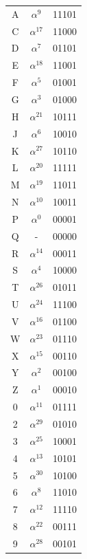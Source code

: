 \documentclass[letterpaper]{article}
\theoremstyle{xxx}
\theoremstyle{evil}
\theoremstyle{yyy}
\theoremstyle{plain}
\theoremstyle{zzz}
\begin{document}
\begin{minipage}[b]{0.3\linewidth}
\begin{center}
\begin{tabular}{|ccc|}
\hline
A & $\alpha^9$ & 11101 \\
C & $\alpha^{17}$ & 11000 \\
D & $\alpha^7$ & 01101 \\
E & $\alpha^{18}$ & 11001 \\
F & $\alpha^5$ & 01001 \\
G & $\alpha^3$ & 01000 \\
H & $\alpha^{21}$ & 10111 \\
J & $\alpha^6$ & 10010 \\
K & $\alpha^{27}$ & 10110 \\
L & $\alpha^{20}$ & 11111 \\
M & $\alpha^{19}$ & 11011 \\
N & $\alpha^{10}$ & 10011 \\
P & $\alpha^0$ & 00001 \\
Q & - & 00000 \\
R & $\alpha^{14}$ & 00011 \\
S & $\alpha^4$ & 10000 \\
T & $\alpha^{26}$ & 01011 \\
U & $\alpha^{24}$ & 11100 \\
V & $\alpha^{16}$ & 01100 \\
W & $\alpha^{23}$ & 01110 \\
X & $\alpha^{15}$ & 00110 \\
Y & $\alpha^2$ & 00100 \\
Z & $\alpha^1$ & 00010 \\
0 & $\alpha^{11}$ & 01111 \\
2 & $\alpha^{29}$ & 01010 \\
3 & $\alpha^{25}$ & 10001 \\
4 & $\alpha^{13}$ & 10101 \\
5 & $\alpha^{30}$ & 10100 \\
6 & $\alpha^8$ & 11010 \\
7 & $\alpha^{12}$ & 11110 \\
8 & $\alpha^{22}$ & 00111 \\
9 & $\alpha^{28}$ & 00101 \\
\hline
\end{tabular}
\end{center}
\end{minipage}
\end{document}
